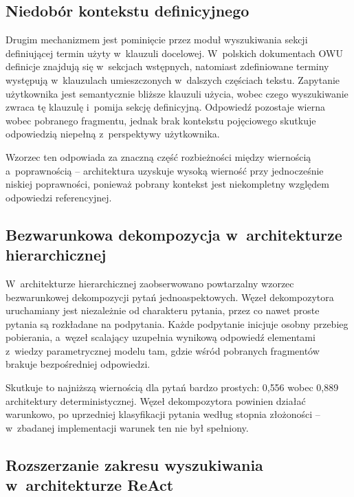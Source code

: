 \subsection{Niedobór kontekstu definicyjnego}\label{subsec:niedobor-kontekstu-definicyjnego}

Drugim mechanizmem jest pominięcie przez moduł wyszukiwania sekcji definiującej
termin użyty w~klauzuli docelowej. W~polskich dokumentach OWU definicje
znajdują się w~sekcjach wstępnych, natomiast zdefiniowane terminy występują
w~klauzulach umieszczonych w~dalszych częściach tekstu. Zapytanie użytkownika
jest semantycznie bliższe klauzuli użycia, wobec czego wyszukiwanie zwraca tę
klauzulę i~pomija sekcję definicyjną. Odpowiedź pozostaje wierna wobec
pobranego fragmentu, jednak brak kontekstu pojęciowego skutkuje odpowiedzią
niepełną z~perspektywy użytkownika.

Wzorzec ten odpowiada za znaczną część rozbieżności między wiernością
a~poprawnością -- architektura uzyskuje wysoką wierność przy jednocześnie
niskiej poprawności, ponieważ pobrany kontekst jest niekompletny względem
odpowiedzi referencyjnej.

\subsection{Bezwarunkowa dekompozycja w~architekturze hierarchicznej}\label{subsec:bezwarunkowa-dekompozycja-w-architekturze-hierarchicznej}

W~architekturze hierarchicznej zaobserwowano powtarzalny wzorzec bezwarunkowej
dekompozycji pytań jednoaspektowych. Węzeł dekompozytora uruchamiany jest
niezależnie od charakteru pytania, przez co nawet proste pytania są rozkładane
na podpytania. Każde podpytanie inicjuje osobny przebieg pobierania, a~węzeł
scalający uzupełnia wynikową odpowiedź elementami z~wiedzy parametrycznej
modelu tam, gdzie wśród pobranych fragmentów brakuje bezpośredniej odpowiedzi.

Skutkuje to najniższą wiernością dla pytań bardzo prostych: 0{,}556 wobec
0{,}889 architektury deterministycznej. Węzeł dekompozytora powinien działać
warunkowo, po uprzedniej klasyfikacji pytania według stopnia złożoności --
w~zbadanej implementacji warunek ten nie był spełniony.

\subsection{Rozszerzanie zakresu wyszukiwania w~architekturze ReAct}\label{subsec:rozszerzanie-zakresu-wyszukiwania-w-architekturze-react}

